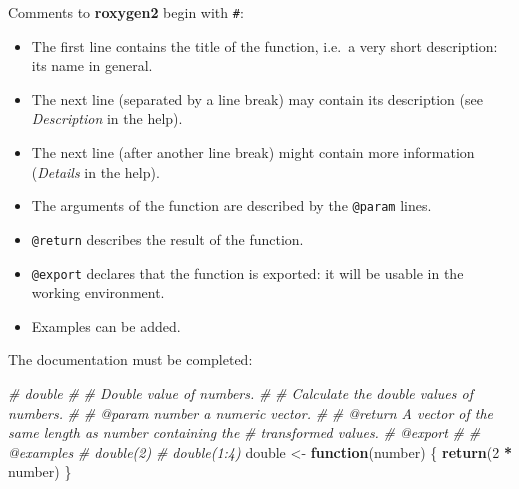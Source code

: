 \documentclass[
  12pt,
  american,
  a4paper,
  extrafontsizes,onecolumn,openright
  ]{memoir}
\newenvironment{Shaded}{\begin{snugshade}}{\end{snugshade}}
\newcommand{\CommentTok}[1]{\textcolor[rgb]{0.56,0.35,0.01}{\textit{#1}}}
\newcommand{\ControlFlowTok}[1]{\textcolor[rgb]{0.13,0.29,0.53}{\textbf{#1}}}
\newcommand{\DecValTok}[1]{\textcolor[rgb]{0.00,0.00,0.81}{#1}}
\newcommand{\FunctionTok}[1]{\textcolor[rgb]{0.13,0.29,0.53}{\textbf{#1}}}
\newcommand{\NormalTok}[1]{#1}
\newcommand{\OtherTok}[1]{\textcolor[rgb]{0.56,0.35,0.01}{#1}}
\newcommand{\SpecialCharTok}[1]{\textcolor[rgb]{0.81,0.36,0.00}{\textbf{#1}}}
\providecommand{\tightlist}{%
  \setlength{\itemsep}{0pt}\setlength{\parskip}{0pt}}
\begin{document}
\normalsize

Comments to \textbf{roxygen2} begin with \texttt{\#\textquotesingle{}}:

\begin{itemize}
\tightlist
\item
  The first line contains the title of the function, i.e.~a very short description: its name in general.
\item
  The next line (separated by a line break) may contain its description (see \emph{Description} in the help).
\item
  The next line (after another line break) might contain more information (\emph{Details} in the help).
\item
  The arguments of the function are described by the \texttt{@param} lines.
\item
  \texttt{@return} describes the result of the function.
\item
  \texttt{@export} declares that the function is exported: it will be usable in the working environment.
\item
  Examples can be added.
\end{itemize}

The documentation must be completed:

\scriptsize

\begin{Shaded}
\begin{Highlighting}[]
\CommentTok{\#\textquotesingle{} double}
\CommentTok{\#\textquotesingle{} }
\CommentTok{\#\textquotesingle{} Double value of numbers.}
\CommentTok{\#\textquotesingle{}}
\CommentTok{\#\textquotesingle{} Calculate the double values of numbers.}
\CommentTok{\#\textquotesingle{} }
\CommentTok{\#\textquotesingle{} @param number a numeric vector.}
\CommentTok{\#\textquotesingle{}}
\CommentTok{\#\textquotesingle{} @return A vector of the same length as \textasciigrave{}number\textasciigrave{} containing the }
\CommentTok{\#\textquotesingle{}   transformed values.}
\CommentTok{\#\textquotesingle{} @export}
\CommentTok{\#\textquotesingle{}}
\CommentTok{\#\textquotesingle{} @examples}
\CommentTok{\#\textquotesingle{} double(2)}
\CommentTok{\#\textquotesingle{} double(1:4)}
\NormalTok{double }\OtherTok{\textless{}{-}} \ControlFlowTok{function}\NormalTok{(number) \{}
  \FunctionTok{return}\NormalTok{(}\DecValTok{2} \SpecialCharTok{*}\NormalTok{ number)}
\NormalTok{\}}
\end{Highlighting}
\end{Shaded}
\end{document}
